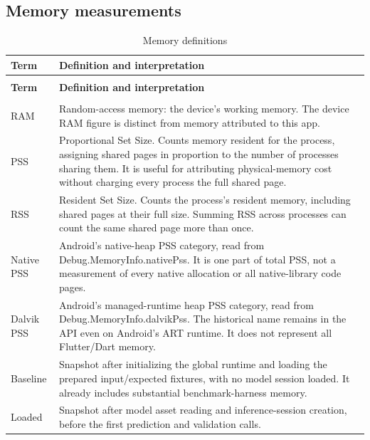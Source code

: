 \documentclass[10pt,a4paper]{article}
\begin{document}
\subsection{Memory measurements}
\begingroup\small\setlength{\tabcolsep}{4pt}\renewcommand{\arraystretch}{1.12}
\begin{longtable}{@{}>{\raggedright\arraybackslash}p{}>{\raggedright\arraybackslash}p{}@{}}
\caption{Memory definitions}\\
\toprule
\textbf{Term} & \textbf{Definition and interpretation} \\
\midrule\endfirsthead
\multicolumn{2}{l}{\small\itshape Continued from previous page}\\
\toprule
\textbf{Term} & \textbf{Definition and interpretation} \\
\midrule\endhead
\midrule\multicolumn{2}{r}{\small Continued on next page}\\\endfoot
\bottomrule\endlastfoot
RAM & Random-access memory:\allowbreak{} the device's working memory. The device RAM figure is distinct from memory attributed to this app. \\
PSS & Proportional Set Size. Counts memory resident for the process, assigning shared pages in proportion to the number of processes sharing them. It is useful for attributing physical-memory cost without charging every process the full shared page. \\
RSS & Resident Set Size. Counts the process's resident memory, including shared pages at their full size. Summing RSS across processes can count the same shared page more than once. \\
Native PSS & Android's native-heap PSS category, read from Debug.MemoryInfo.nativePss. It is one part of total PSS, not a measurement of every native allocation or all native-library code pages. \\
Dalvik PSS & Android's managed-runtime heap PSS category, read from Debug.MemoryInfo.dalvikPss. The historical name remains in the API even on Android's ART runtime. It does not represent all Flutter/\allowbreak{}Dart memory. \\
Baseline & Snapshot after initializing the global runtime and loading the prepared input/\allowbreak{}expected fixtures, with no model session loaded. It already includes substantial benchmark-harness memory. \\
Loaded & Snapshot after model asset reading and inference-session creation, before the first prediction and validation calls. \\

\end{longtable}
\end{document}
